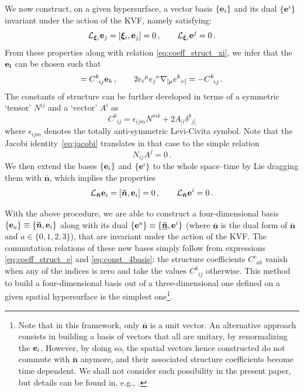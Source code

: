\documentclass[notitlepage,onecolumn,floatfix,preprintnumbers,aps,prd,showpacs,nofootinbib,amsmath,amssymb,amsfonts]{revtex4-1}
\newcommand{\Lie}{\mathcal{L}}
\newcommand{\be}{\begin{equation}}
\newcommand{\ee}{\end{equation}}
\newcommand{\<}{\langle}
\renewcommand{\>}{\rangle}
\begin{document}
We now construct, on a given hypersurface, a vector basis $\{ {\bf e}_i \}$ and its dual $\{ {\bf e}^i \}$ 
invariant under the action of the KVF, namely satisfying: 
\be \label{eq:const_3basis}
	\Lie_{\bm \xi_i} {\bf e}_j = [\bm \xi_i, {\bf e}_j ] = 0 \, , 
		\qquad 
	\Lie_{\bm \xi_i} {\bf e}^j = 0 \, . 
\ee
From these properties along with relation \eqref{eq:coeff_struct_xi}, we infer that the $\bf{e}_i$ can be chosen such that 
\be
	[ {\bf e}_i, {\bf e}_j ] 
		= C^k_{\phantom{k} i j} {\bf e}_k \, , 
		\qquad 
	2 {e_i}^\mu {e_j}^\nu \nabla_{[\mu} {e^k}_{\nu]} 
		= - C^k_{\phantom{k} i j} \, . 
	\label{eq:coeff_struct_e}
\ee
The constants of structure can be further developed in terms of a symmetric `tensor' $N^{i j}$ 
and a `vector' $A^i$ as 
\be
	C^k_{\phantom{k} i j} 
		= \epsilon_{i j m} N^{m k} + 2 A_{[i} \delta^k_{\phantom{k} j]} 
	\label{eq:ToBianchiType}
\ee
where $\epsilon_{i j m}$ denotes the totally anti-symmetric Levi-Civita symbol. 
Note that the Jacobi identity~\eqref{eq:jacobi} translates in that case to the simple relation 
\be \label{eq:na}
	N_{ij} A^j = 0 \, . 
\ee
We then extend the bases $\{ {\bf e}_i \}$ and $\{{\bf e}^i \}$ to the whole space--time by Lie dragging 
them with $\bm{\bar n}$, which implies the properties 
\be \label{eq:const_4basis}
	\Lie_{\bm{\bar n}} {\bf e}_i = [\bm{\bar n}, {\bf e}_i ] = 0 \, , 
		\qquad 
	\Lie_{\bm{\bar n}} {\bf e}^i = 0 \, . 
\ee

With the above procedure, we are able to construct a four-dimensional basis 
$\{ {\bf e}_a \} \equiv \{ \bm{\bar n}, {\bf e}_i \}$ along with its dual 
$\{ {\bf e}^a \} \equiv \{ \bm{\underline{\bar n}}, {\bf e}^i \}$ 
(where $\bm{\underline{\bar n}}$ is the dual form of $\bm{\bar n}$ and $a \in \{ 0, 1, 2, 3 \}$),
that are invariant under the action of the KVF. 
%
The commutation relations of these new bases simply follow from expressions \eqref{eq:coeff_struct_e} and \eqref{eq:const_4basis}: 
the structure coefficients $C^c_{\phantom{c} a b}$ vanish when any of the indices is zero and take the values 
$C^k_{\phantom{k} i j}$ otherwise. 
%
This method to build a four-dimensional basis out of a three-dimensional one defined on a given spatial hypersurface 
is the simplest one\footnote{Note that in this framework, only $\bm{\bar n}$ is a unit vector. An alternative approach 
consists in building a basis of vectors that all are unitary, by renormalizing the ${\bf e}_i$. However, by doing so, 
the spatial vectors hence constructed do not commute with $\bm{\bar n}$ anymore, and their associated structure coefficients 
become time dependent. We shall not consider such possibility in the present paper, but details can be found in, e.g., 
\cite{1969CMaPh..12..108E,Ellis:1998ct,Pontzen:2007ii}.}. 
\end{document}
